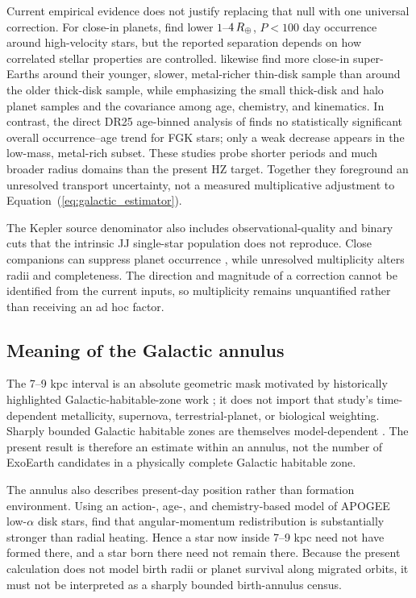 Current empirical evidence does not justify replacing that null with one
universal correction. For close-in planets, \citet{Dai2021} find lower
$1$--$4\,R_{\oplus}$, $P<100$ day occurrence around high-velocity stars, but the
reported separation depends on how correlated stellar properties are
controlled. \citet{BashiZucker2022} likewise find more close-in super-Earths
around their younger, slower, metal-richer thin-disk sample than around the
older thick-disk sample, while emphasizing the small thick-disk and halo
planet samples and the covariance among age, chemistry, and kinematics. In
contrast, the direct DR25 age-binned analysis of \citet{Sayeed2025} finds no
statistically significant overall occurrence--age trend for FGK stars; only a
weak decrease appears in the low-mass, metal-rich subset. These studies probe
shorter periods and much broader radius domains than the present HZ target.
Together they foreground an unresolved transport uncertainty, not a measured
multiplicative adjustment to Equation~(\ref{eq:galactic_estimator}).

The Kepler source denominator also includes observational-quality and binary
cuts that the intrinsic JJ single-star population does not reproduce. Close
companions can suppress planet occurrence \citep{Kraus2016}, while unresolved
multiplicity alters radii and completeness. The direction and magnitude of a
correction cannot be identified from the current inputs, so multiplicity
remains unquantified rather than receiving an ad hoc factor.

\subsection{Meaning of the Galactic annulus}

The 7--9 kpc interval is an absolute geometric mask motivated by historically
highlighted Galactic-habitable-zone work \citep{Lineweaver2004}; it does not
import that study's time-dependent metallicity, supernova, terrestrial-planet,
or biological weighting. Sharply bounded Galactic habitable zones are
themselves model-dependent \citep{Prantzos2008,Gowanlock2011}. The present
result is therefore an estimate within an annulus, not the number of ExoEarth
candidates in a physically complete Galactic habitable zone.

The annulus also describes present-day position rather than formation
environment. Using an action-, age-, and chemistry-based model of APOGEE
low-$\alpha$ disk stars, \citet{Frankel2020} find that angular-momentum
redistribution is substantially stronger than radial heating. Hence a star now
inside 7--9 kpc need not have formed there, and a star born there need not
remain there. Because the present calculation does not model birth radii or
planet survival along migrated orbits, it must not be interpreted as a sharply
bounded birth-annulus census.

